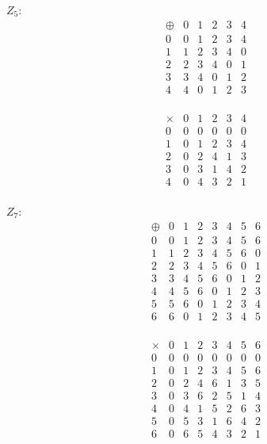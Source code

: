 \documentclass{article}
\begin{document}
\(Z_5\):
\[
   \begin{array}{c|ccccc}
   \oplus & 0 & 1 & 2 & 3 & 4 \\\hline
   0 & 0 & 1 & 2 & 3 & 4 \\
   1 & 1 & 2 & 3 & 4 & 0 \\
   2 & 2 & 3 & 4 & 0 & 1 \\
   3 & 3 & 4 & 0 & 1 & 2 \\
   4 & 4 & 0 & 1 & 2 & 3 \\
   \end{array}
\]

\[
\begin{array}{c|ccccc}
\times & 0 & 1 & 2 & 3 & 4 \\\hline
0 & 0 & 0 & 0 & 0 & 0 \\
1 & 0 & 1 & 2 & 3 & 4 \\
2 & 0 & 2 & 4 & 1 & 3 \\
3 & 0 & 3 & 1 & 4 & 2 \\
4 & 0 & 4 & 3 & 2 & 1 \\
\end{array}
\]

\(Z_7\):
\[
   \begin{array}{c|ccccccc}
   \oplus & 0 & 1 & 2 & 3 & 4 & 5 & 6 \\\hline
   0 & 0 & 1 & 2 & 3 & 4 & 5 & 6 \\
   1 & 1 & 2 & 3 & 4 & 5 & 6 & 0 \\
   2 & 2 & 3 & 4 & 5 & 6 & 0 & 1 \\
   3 & 3 & 4 & 5 & 6 & 0 & 1 & 2 \\
   4 & 4 & 5 & 6 & 0 & 1 & 2 & 3 \\
   5 & 5 & 6 & 0 & 1 & 2 & 3 & 4 \\
   6 & 6 & 0 & 1 & 2 & 3 &4&5\\
   \end{array}
\]

\[
\begin{array}{c|ccccccc}
\times & 0 & 1 & 2 & 3 & 4 & 5 & 6 \\\hline
0 & 0 & 0 & 0 & 0 & 0 & 0 & 0 \\
1 & 0 & 1 & 2 & 3 & 4 & 5 & 6 \\
2 & 0 & 2 & 4 & 6 & 1 & 3 & 5 \\
3 & 0 & 3 & 6 & 2 & 5 & 1 & 4 \\
4 & 0 & 4 & 1 & 5 & 2 & 6 & 3 \\
5 & 0 & 5 & 3 & 1 & 6 & 4 & 2 \\
6 & 0 & 6 & 5 & 4 & 3 & 2 & 1 \\
\end{array}
\]
\end{document}
